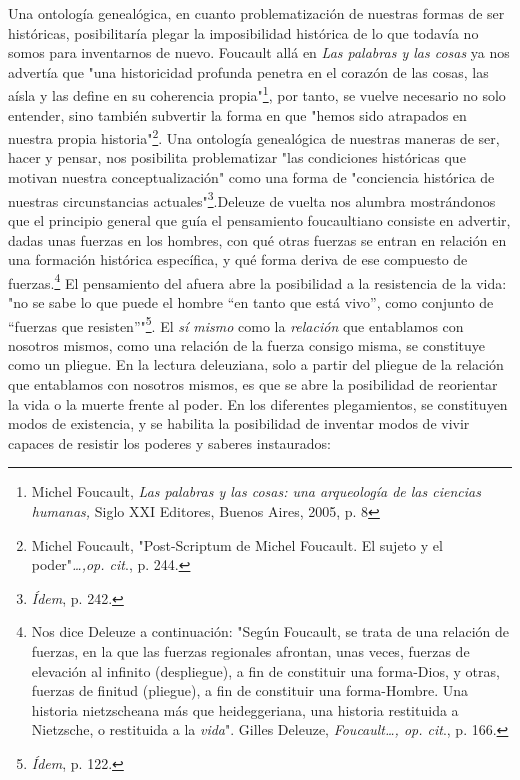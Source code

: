 Una ontología genealógica, en cuanto problematización de nuestras formas
de ser históricas, posibilitaría plegar la imposibilidad histórica de lo
que todavía no somos para inventarnos de nuevo. Foucault allá en
\emph{Las palabras y las cosas} ya nos advertía que "una historicidad
profunda penetra en el corazón de las cosas, las aísla y las define en
su coherencia propia"\footnote{Michel Foucault, \emph{Las palabras y las
  cosas: una arqueología de las ciencias humanas,} Siglo XXI Editores,
  Buenos Aires, 2005, p. 8}, por tanto, se vuelve necesario no solo
entender, sino también subvertir la forma en que "hemos sido atrapados
en nuestra propia historia"\footnote{Michel Foucault, "Post-Scriptum de
  Michel Foucault. El sujeto y el poder"\emph{\ldots,op. cit}., p. 244.}.
Una ontología genealógica de nuestras maneras de ser, hacer y pensar,
nos posibilita problematizar "las condiciones históricas que motivan
nuestra conceptualización" como una forma de "conciencia histórica de
nuestras circunstancias actuales"\footnote{\emph{Ídem}, p. 242.}.Deleuze
de vuelta nos alumbra mostrándonos que el principio general que guía el
pensamiento foucaultiano consiste en advertir, dadas unas fuerzas en los
hombres, con qué otras fuerzas se entran en relación en una formación
histórica específica, y qué forma deriva de ese compuesto de
fuerzas.\footnote{Nos dice Deleuze a continuación: "Según Foucault, se
  trata de una relación de fuerzas, en la que las fuerzas regionales
  afrontan, unas veces, fuerzas de elevación al infinito (despliegue), a
  fin de constituir una forma-Dios, y otras, fuerzas de finitud
  (pliegue), a fin de constituir una forma-Hombre. Una historia
  nietzscheana más que heideggeriana, una historia restituida a
  Nietzsche, o restituida a la \emph{vida}". Gilles Deleuze,
  \emph{Foucault\ldots, op. cit}., p. 166.} El pensamiento del afuera
abre la posibilidad a la resistencia de la vida: "no se sabe lo que
puede el hombre ``en tanto que está vivo'', como conjunto de ``fuerzas
que resisten''"\footnote{\emph{Ídem}, p. 122.}. El \emph{sí mismo} como
la \emph{relación} que entablamos con nosotros mismos, como una relación
de la fuerza consigo misma, se constituye como un pliegue. En la lectura
deleuziana, solo a partir del pliegue de la relación que entablamos con
nosotros mismos, es que se abre la posibilidad de reorientar la vida o
la muerte frente al poder. En los diferentes plegamientos, se
constituyen modos de existencia, y se habilita la posibilidad de
inventar modos de vivir capaces de resistir los poderes y saberes
instaurados:

